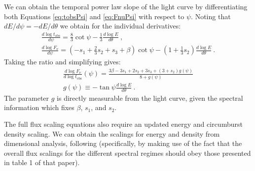 \documentclass[twocolumn]{aastex62}
\newcommand{\tobs}{\ensuremath{t_{\mathrm{obs}}}}
\begin{document}
	We can obtain the temporal power law slope of the light curve by differentiating both Equations \eqref{eq:tobsPsi} and \eqref{eq:FnuPsi} with respect to $\psi$.  Noting that $dE/d\psi = -dE/d\theta$ we obtain for the individual derivatives:
\begin{eqnarray}
	\frac{d \log \tobs}{d \psi} = \frac{8}{3} \cot \psi - \frac{1}{3} \frac{d \log E}{d \theta}\ , \\
	\frac{d \log F_\nu}{d \psi} = \left(-s_1 + \frac{2}{3} s_2 +s_3+\beta\right)\cot \psi - \left(1+\frac{1}{3}s_2\right) \frac{d \log E}{d \theta}\ .
\end{eqnarray}
Taking the ratio and simplifying gives:
\begin{eqnarray}
	\frac{d \log F_\nu}{d \log \tobs}(\psi) = \frac{3 \beta - 3s_1 + 2s_2+3s_3 + (3+s_2)g(\psi)}{ 8+g(\psi)} \\
	g(\psi) \equiv -\tan \psi \frac{d \log E}{d \theta}\ .
\end{eqnarray}
The parameter $g$ is directly measurable from the light curve, given the spectral information which fixes $\beta$, $s_1$, and $s_2$.

The full flux scaling equations also require an updated energy and circumburst density scaling. We can obtain the scalings for energy and density from dimensional analysis, following \cite{van-Eerten:2012ac} (specifically, by making use of the fact that the overall flux scalings for the different spectral regimes should obey those presented in table 1 of that paper).
\end{document}
